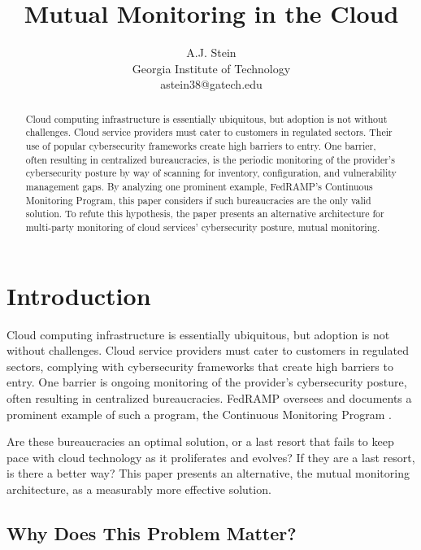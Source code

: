 \documentclass{jdf}
\begin{document}
\title{Mutual Monitoring in the Cloud}
\author{A.J. Stein \\ Georgia Institute of Technology \\ astein38@gatech.edu}

\maketitle
\thispagestyle{fancy}

\begin{abstract}
    Cloud computing infrastructure is essentially ubiquitous, but adoption is not without challenges. Cloud service providers must cater to customers in regulated sectors. Their use of popular cybersecurity frameworks create high barriers to entry. One barrier, often resulting in centralized bureaucracies, is the periodic monitoring of the provider's cybersecurity posture by way of scanning for inventory, configuration, and vulnerability management gaps. By analyzing one prominent example, FedRAMP's Continuous Monitoring Program, this paper considers if such bureaucracies are the only valid solution. To refute this hypothesis, the paper presents an alternative architecture for multi-party monitoring of cloud services' cybersecurity posture, mutual monitoring.
\end{abstract}

\section{Introduction}

Cloud computing infrastructure is essentially ubiquitous, but adoption is not without challenges. Cloud service providers must cater to customers in regulated sectors, complying with cybersecurity frameworks that create high barriers to entry. One barrier is ongoing monitoring of the provider's cybersecurity posture, often resulting in centralized bureaucracies. FedRAMP oversees and documents a prominent example of such a program, the Continuous Monitoring Program \citeyear[p.~14]{fedramp_auth_playbook25}.

Are these bureaucracies an optimal solution, or a last resort that fails to keep pace with cloud technology as it proliferates and evolves? If they are a last resort, is there a better way? This paper presents an alternative, the mutual monitoring architecture, as a measurably more effective solution.

\subsection{Why Does This Problem Matter?}
\end{document}
